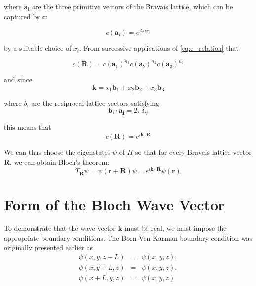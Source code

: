 	where $\mathbf{a_{i}}$ are the three primitive vectors of the Bravais lattice, which can be captured by $\mathbf{c}$: 

	\begin{equation} \label{eq:c_exp}
			c(\mathbf{a}_{i}) = e^{2 \pi i x_{i}}
	\end{equation}

	by a suitable choice  of $x_i$. From successive applications of \ref{eq:c_relation} that

	\begin{equation} \label{eq:c_mult}
		c(\mathbf{R})
		= c(\mathbf{a}_1)^{n_1}
		c(\mathbf{a}_2)^{n_2}
		c(\mathbf{a}_3)^{n_3}
	\end{equation}

	and since
	\begin{equation} \label{eq:k_with_bi}
		\mathbf{k} = x_1 \mathbf{b}_1
		+ x_2\mathbf{b}_2
		+ x_3 \mathbf{b}_3
	\end{equation}

	where $b_i$ are the reciprocal lattice vectors satisfying
	\begin{equation} \label{eq:recip_b}
		\mathbf{b_i \cdot a_j}
		= 2 \pi \delta_{ij}
	\end{equation}

	this means that
	\begin{equation} \label{eq:c(R)}
		c(\mathbf{R}) 
		= e^{i \mathbf{k} \cdot \mathbf{R}}
	\end{equation}

	We can thus choose the eigenstates $\psi$ of $H$ so that for every Bravais lattice vector $\mathbf{R}$, we can obtain Bloch's theorem:
	\begin{equation} \label{eq:bloch_proof_qm}
		T_{\mathbf{R}} \psi
		= \psi(\mathbf{r} + \mathbf{R}) \psi
		= e^{i \mathbf{k} \cdot \mathbf{R}}
	\psi(\mathbf{r})
	\end{equation}

\section{Form of the Bloch Wave Vector}
	To demonstrate that the wave vector $\mathbf{k}$ must be real, we must impose the appropriate boundary conditions. The Born-Von Karman boundary condition was originally presented earlier as
	\begin{eqnarray} \label{eq:bvk_ch2}
		\psi(x,y,z+L) &=& \psi(x,y,z), \\ \nonumber
		\psi(x,y+L,z) &=& \psi(x,y,z), \\
		\psi(x+L,y,z) &=& \psi(x,y,z) \nonumber
	\end{eqnarray}

